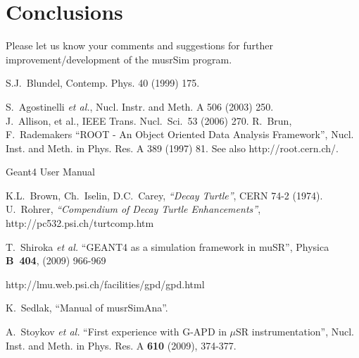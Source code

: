 \documentclass[twoside]{dis04}
\begin{document}
\clearpage



%

\section{Conclusions}
Please let us know your comments and suggestions for further improvement/development of the
musrSim program.




\begin{thebibliography}{0}

  S.J.~Blundel,  Contemp. Phys. 40 (1999) 175.

 S.~Agostinelli {\it et al.}, Nucl. Instr. and Meth. A 506 (2003) 250.\\ %
                J.~Allison, et al., IEEE Trans. Nucl.\ Sci.\  53 (2006) 270. %
 R.~Brun, F.~Rademakers ``ROOT - An Object Oriented Data Analysis Framework'',
Nucl. Inst. and Meth. in Phys. Res. A 389 (1997) 81.%
See also http://root.cern.ch/.

 Geant4 User Manual

K.L.~Brown, Ch.~Iselin, D.C.~Carey, {\it``Decay Turtle''}, CERN 74-2 (1974). \\
U.~Rohrer, {\it ``Compendium of Decay Turtle Enhancements''},
http://pc532.psi.ch/turtcomp.htm

T.~Shiroka {\it et al.} ``GEANT4 as a simulation framework in muSR'',
Physica {\bf B~404}, (2009) 966-969
% 

http://lmu.web.psi.ch/facilities/gpd/gpd.html

K.~Sedlak, ``Manual of musrSimAna''.

A.~Stoykov {\it et al.} ``First experience with G-APD in $\mu$SR instrumentation'',
Nucl. Inst. and Meth. in Phys. Res. A {\bf 610} (2009), 374-377.

\end{thebibliography}
\end{document}

